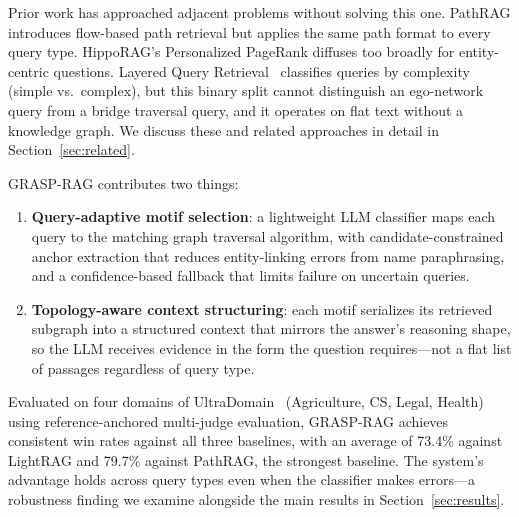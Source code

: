 Prior work has approached adjacent problems without solving this one.
PathRAG introduces flow-based path retrieval but applies the same path
format to every query type.
HippoRAG's Personalized PageRank diffuses too broadly for entity-centric
questions.
Layered Query Retrieval~\cite{huang2024layered} classifies queries by
complexity (simple vs.\ complex), but this binary split cannot distinguish
an ego-network query from a bridge traversal query, and it operates on flat
text without a knowledge graph.
We discuss these and related approaches in detail in
Section~\ref{sec:related}.

GRASP-RAG contributes two things:
\begin{enumerate}
  \item \textbf{Query-adaptive motif selection}: a lightweight LLM classifier
    maps each query to the matching graph traversal algorithm, with
    candidate-constrained anchor extraction that reduces entity-linking
    errors from name paraphrasing, and a confidence-based fallback that limits
    failure on uncertain queries.
  \item \textbf{Topology-aware context structuring}: each motif serializes its
    retrieved subgraph into a structured context that mirrors the answer's
    reasoning shape, so the LLM receives evidence in the form the question
    requires---not a flat list of passages regardless of query type.
\end{enumerate}

Evaluated on four domains of UltraDomain~\cite{ding2024ultradomain}
(Agriculture, CS, Legal, Health) using reference-anchored multi-judge
evaluation, GRASP-RAG achieves consistent win rates against all three
baselines, with an average of 73.4\% against LightRAG and 79.7\% against
PathRAG, the strongest baseline.
The system's advantage holds across query types even when the classifier
makes errors---a robustness finding we examine alongside the main results in
Section~\ref{sec:results}.
